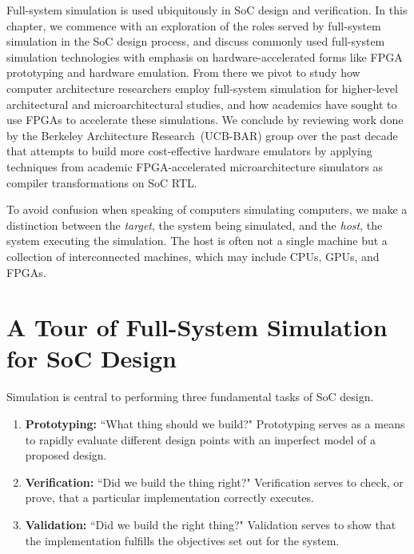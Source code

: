 Full-system simulation is used ubiquitously in SoC design and verification. In
this chapter, we commence with an exploration of the roles served by
full-system simulation
in the SoC design process, and discuss commonly used full-system
simulation technologies with emphasis on hardware-accelerated forms like FPGA
prototyping and hardware emulation. From there we pivot to study how computer
architecture researchers employ full-system simulation for higher-level
architectural and microarchitectural studies, and how academics have sought to
use FPGAs to accelerate these simulations.
We conclude by reviewing work done by the Berkeley Architecture
Research~(UCB-BAR) group over the past decade that attempts to build more
cost-effective hardware emulators by applying techniques from academic
FPGA-accelerated microarchitecture simulators as compiler transformations on
SoC RTL.

To avoid confusion when speaking of computers simulating computers, we make a distinction between the \emph{target}, the system
being simulated, and the \emph{host}, the system
executing the simulation. The host is often not a single machine but
a collection of interconnected machines, which may include CPUs,
GPUs, and FPGAs.

\section{A Tour of Full-System Simulation for SoC Design}

Simulation is central to performing three fundamental tasks of SoC design.

\begin{enumerate}

    \item \textbf{Prototyping:} ``What thing should we
        build?" Prototyping serves as a means to rapidly evaluate different
        design points with an imperfect model of a proposed design.

    \item \textbf{Verification:} ``Did we build the thing right?" Verification
        serves to check, or prove, that a particular implementation
        correctly executes.

    \item \textbf{Validation:} ``Did we build the right thing?" Validation
        serves to show that the implementation fulfills the objectives set out
        for the system.

\end{enumerate}

